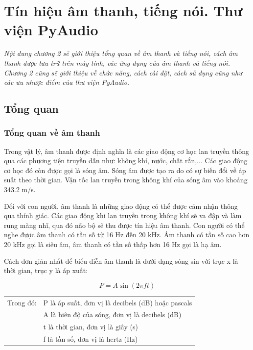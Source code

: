 \chapter{Tín hiệu âm thanh, tiếng nói. Thư viện PyAudio}
\ifpdf
    \graphicspath{{Chapter2/Chapter2Figs/PNG/}{Chapter2/Chapter2Figs/PDF/}{Chapter2/Chapter2Figs/}}
\else
    \graphicspath{{Chapter2/Chapter2Figs/EPS/}{Chapter2/Chapter2Figs/}}
\fi
\textit{Nội dung chương 2 sẽ giới thiệu tổng quan về âm thanh và tiếng nói, cách âm thanh được lưu trữ trên máy tính, các ứng dụng của âm thanh và tiếng nói. Chương 2 cũng sẽ giới thiệu về chức năng, cách cài đặt, cách sử dụng cũng như các ưu nhược điểm của thư viện PyAudio.}
\section{Tổng quan}
\subsection{Tổng quan về âm thanh}
Trong vật lý, âm thanh được định nghĩa là các giao động cơ học lan truyền thông qua các phương tiện truyền dẫn như: không khí, nước, chất rắn,... Các giao động cơ học đó còn được gọi là sóng âm. Sóng âm được tạo ra do có sự biến đổi về áp suất theo thời gian. Vận tốc lan truyền trong không khí của sóng âm vào khoảng 343.2 m/s.

Đối với con người, âm thanh là những giao động có thể được cảm nhận thông qua thính giác. Các giao động khi lan truyền trong không khí sẽ va đập và làm rung màng nhĩ, qua đó não bộ sẽ thu được tín hiệu âm thanh. Con người có thể nghe được âm thanh có tần số từ 16 Hz đến 20 kHz. Âm thanh có tần số cao hơn 20 kHz gọi là siêu âm, âm thanh có tần số thấp hơn 16 Hz gọi là hạ âm.

Cách đơn giản nhất để biểu diễn âm thanh là dưới dạng sóng sin với trục x là thời gian, trục y là áp xuất:

\begin{equation}
P = A\sin (2\pi ft)
\end{equation}

\begin{tabular}{ rl }
Trong đó: & P là áp suất, đơn vị là decibels (dB) hoặc pascals \\
& A là biên độ của sóng, đơn vị là decibels (dB) \\
& t là thời gian, đơn vị là giây (s) \\
& f là tần số, đơn vị là hertz (Hz)
\end{tabular}

